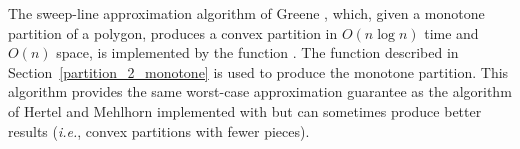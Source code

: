 The sweep-line approximation algorithm of Greene \cite{g-dpcp-83}, which, 
given a monotone partition of a polygon, produces a convex partition in 
$O(n \log n)$ time and $O(n)$ space, is implemented
by the function %
.  The function
 described in Section~\ref{partition_2_monotone}
is used to produce the monotone
partition.  This algorithm provides the same worst-case approximation guarantee 
as the algorithm of Hertel and Mehlhorn implemented with
 but can sometimes produce better
results ({\em i.e.}, convex partitions with fewer pieces).
